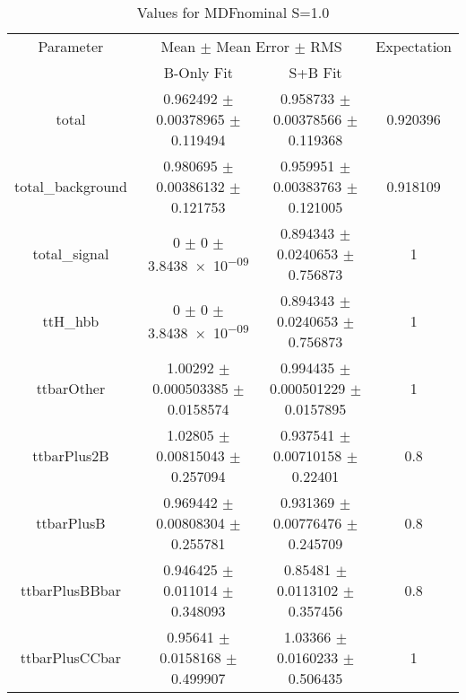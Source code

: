 \begin{table}
\centering
\caption{Values for MDFnominal S=1.0}
\begin{tabular}{cccc}
\toprule
Parameter & \multicolumn{2}{c}{Mean $\pm$ Mean Error $\pm$ RMS} & Expectation\\
 & B-Only Fit & S+B Fit & \\
\midrule
total & \num{0.962492} $\pm$ \num{0.00378965} $\pm$ \num{0.119494} & \num{0.958733} $\pm$ \num{0.00378566} $\pm$ \num{0.119368} & \num{0.920396}\\
total\_background & \num{0.980695} $\pm$ \num{0.00386132} $\pm$ \num{0.121753} & \num{0.959951} $\pm$ \num{0.00383763} $\pm$ \num{0.121005} & \num{0.918109}\\
total\_signal & \num{0} $\pm$ \num{0} $\pm$ \num{3.8438e-09} & \num{0.894343} $\pm$ \num{0.0240653} $\pm$ \num{0.756873} & \num{1}\\
ttH\_hbb & \num{0} $\pm$ \num{0} $\pm$ \num{3.8438e-09} & \num{0.894343} $\pm$ \num{0.0240653} $\pm$ \num{0.756873} & \num{1}\\
ttbarOther & \num{1.00292} $\pm$ \num{0.000503385} $\pm$ \num{0.0158574} & \num{0.994435} $\pm$ \num{0.000501229} $\pm$ \num{0.0157895} & \num{1}\\
ttbarPlus2B & \num{1.02805} $\pm$ \num{0.00815043} $\pm$ \num{0.257094} & \num{0.937541} $\pm$ \num{0.00710158} $\pm$ \num{0.22401} & \num{0.8}\\
ttbarPlusB & \num{0.969442} $\pm$ \num{0.00808304} $\pm$ \num{0.255781} & \num{0.931369} $\pm$ \num{0.00776476} $\pm$ \num{0.245709} & \num{0.8}\\
ttbarPlusBBbar & \num{0.946425} $\pm$ \num{0.011014} $\pm$ \num{0.348093} & \num{0.85481} $\pm$ \num{0.0113102} $\pm$ \num{0.357456} & \num{0.8}\\
ttbarPlusCCbar & \num{0.95641} $\pm$ \num{0.0158168} $\pm$ \num{0.499907} & \num{1.03366} $\pm$ \num{0.0160233} $\pm$ \num{0.506435} & \num{1}\\
\bottomrule
\end{tabular}
\end{table}